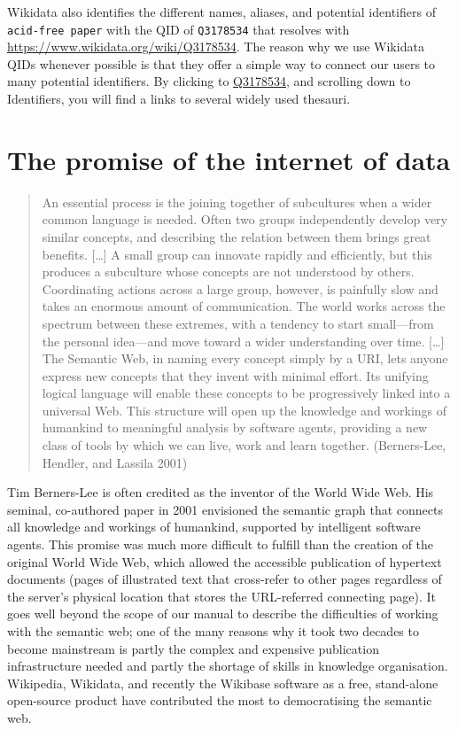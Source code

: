 \documentclass[
  letterpaper,
  DIV=11,
  numbers=noendperiod]{scrreprt}
\begin{document}
Wikidata also identifies the different names, aliases, and potential
identifiers of \texttt{acid-free\ paper} with the QID of
\texttt{Q3178534} that resolves with
\url{https://www.wikidata.org/wiki/Q3178534}. The reason why we use
Wikidata QIDs whenever possible is that they offer a simple way to
connect our users to many potential identifiers. By clicking to
\href{https://www.wikidata.org/wiki/Q3178534}{Q3178534}, and scrolling
down to Identifiers, you will find a links to several widely used
thesauri.

\section{The promise of the internet of
data}\label{the-promise-of-the-internet-of-data}

\begin{quote}
An essential process is the joining together of subcultures when a wider
common language is needed. Often two groups independently develop very
similar concepts, and describing the relation between them brings great
benefits. {[}\ldots{]} A small group can innovate rapidly and
efficiently, but this produces a subculture whose concepts are not
understood by others. Coordinating actions across a large group,
however, is painfully slow and takes an enormous amount of
communication. The world works across the spectrum between these
extremes, with a tendency to start small---from the personal idea---and
move toward a wider understanding over time. {[}\ldots{]} The Semantic
Web, in naming every concept simply by a URI, lets anyone express new
concepts that they invent with minimal effort. Its unifying logical
language will enable these concepts to be progressively linked into a
universal Web. This structure will open up the knowledge and workings of
humankind to meaningful analysis by software agents, providing a new
class of tools by which we can live, work and learn together.
(Berners-Lee, Hendler, and Lassila 2001)
\end{quote}

Tim Berners-Lee is often credited as the inventor of the World Wide Web.
His seminal, co-authored paper in 2001 envisioned the semantic graph
that connects all knowledge and workings of humankind, supported by
intelligent software agents. This promise was much more difficult to
fulfill than the creation of the original World Wide Web, which allowed
the accessible publication of hypertext documents (pages of illustrated
text that cross-refer to other pages regardless of the server's physical
location that stores the URL-referred connecting page). It goes well
beyond the scope of our manual to describe the difficulties of working
with the semantic web; one of the many reasons why it took two decades
to become mainstream is partly the complex and expensive publication
infrastructure needed and partly the shortage of skills in knowledge
organisation. Wikipedia, Wikidata, and recently the Wikibase software as
a free, stand-alone open-source product have contributed the most to
democratising the semantic web.
\end{document}
